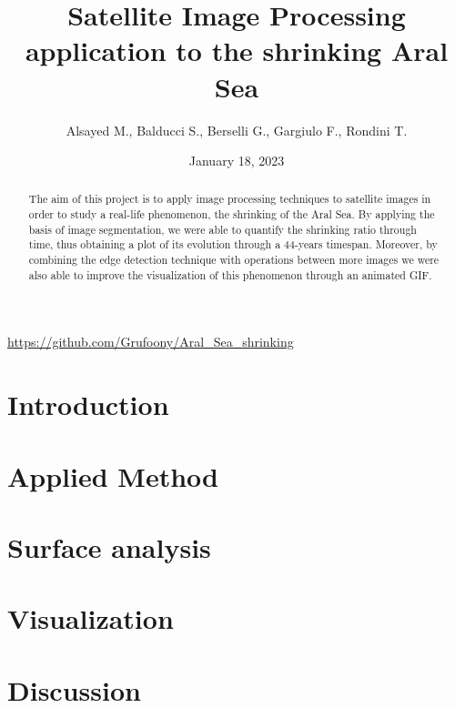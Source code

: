 \documentclass[12pt,a4paper]{article}
\title{Satellite Image Processing application to the shrinking Aral Sea}
\author{Alsayed M., Balducci S., Berselli G., Gargiulo F., Rondini T.}
\date{January 18, 2023}
\begin{document}
\maketitle
\begin{center}
	\url{https://github.com/Grufoony/Aral_Sea_shrinking}
\end{center}

\begin{abstract}
    The aim of this project is to apply image processing techniques to satellite images in order to study a real-life phenomenon, the shrinking of the Aral Sea.
    By applying the basis of image segmentation, we were able to quantify the shrinking ratio through time, thus obtaining a plot of its evolution through a 44-years timespan.
    Moreover, by combining the edge detection technique with operations between more images we were also able to improve the visualization of this phenomenon through an animated GIF.
\end{abstract}
\thispagestyle{empty}

\newpage
\thispagestyle{empty}
\addtocounter{page}{-2}
\mbox{}

\tableofcontents
\pagebreak

\section*{Introduction}

\pagebreak

\section{Applied Method}

\pagebreak

\section{Surface analysis}

\pagebreak

\section{Visualization}

\pagebreak

\section{Discussion}


\newpage
\thispagestyle{empty}
\mbox{}

\appendix
\end{document}
